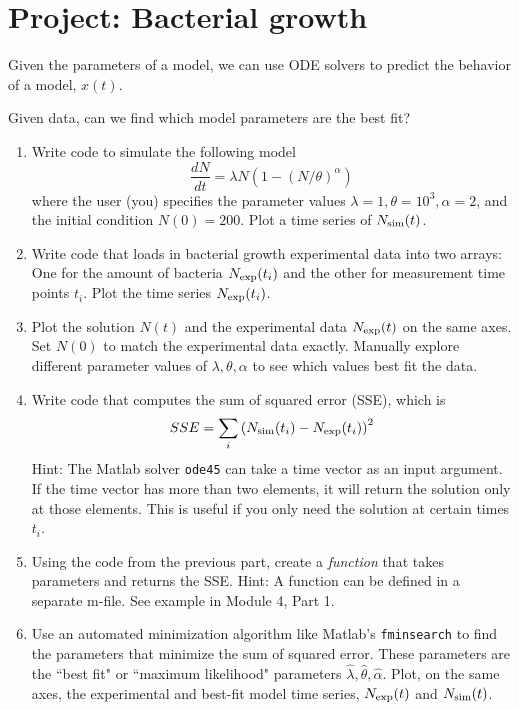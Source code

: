 \documentclass{exam}
\begin{document}
\section*{Project: Bacterial growth}
 
 
Given the parameters of a model, we can use ODE solvers to predict the behavior of a model, $x(t)$. 

Given data, can we find which model parameters are the best fit? 


\begin{enumerate}[a]
\item Write code to simulate the following model
\begin{equation}
\frac{dN}{dt} = \lambda N \left( 1 - \left(N/\theta\right)^\alpha\right) 
\end{equation}
where the user (you) specifies the parameter values $\lambda=1,\theta=10^3,\alpha=2$, and the initial condition $N(0)=200$. Plot a time series of $N_{\rm sim}(t)$.
\item Write code that loads in bacterial growth experimental data into two arrays: One for the amount of bacteria $N_{\rm exp}(t_i)$ and the other for measurement time points $t_i$. Plot the time series $N_{\rm exp}(t_i)$. 
\item Plot the solution $N(t)$ and the experimental data $N_{\rm exp}(t)$ on the same axes. Set $N(0)$ to match the experimental data exactly. 
Manually explore different parameter values of $\lambda,\theta,\alpha$ to see which values best fit the data.
\item Write code that computes the sum of squared error (SSE), which is 
\begin{equation}
SSE = \sum_i \left( N_{\rm sim}(t_i) - N_{\rm exp}(t_i)\right)^2
\end{equation}
Hint: The Matlab solver \verb|ode45| can take a time vector as an input argument. If the time vector has more than two elements, it will return the solution only at those elements. This is useful if you only need the solution at certain times $t_i$. 
\item Using the code from the previous part, create a \textit{function} that takes parameters and returns the SSE.
Hint: A function can be defined in a separate m-file. See example in Module 4, Part 1.  
\item Use an automated minimization algorithm like Matlab's \verb|fminsearch| to find the parameters that minimize the sum of squared error. 
These parameters are the ``best fit" or ``maximum likelihood" parameters $\hat\lambda,\hat\theta,\hat\alpha$.  
Plot, on the same axes, the experimental and best-fit model time series, $N_{\rm exp}(t)$ and $N_{\rm sim}(t)$.
\end{enumerate}
 

  
\end{document}
